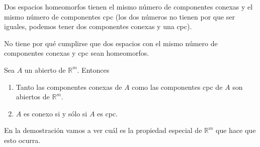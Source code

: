 \documentclass{apuntes}
\begin{document}
\begin{corol} Dos espacios homeomorfos tienen el mismo número de componentes conexas y el mismo número de componentes cpc (los dos números no tienen por que ser iguales, podemos tener dos componentes conexas y una cpc).

No tiene por qué cumplirse que dos espacios con el mismo número de componentes conexas y cpc sean homeomorfos.
\end{corol}

\begin{prop} Sea $A$ un abierto de $ℝ^m$. Entonces

\begin{enumerate}
	\item Tanto las componentes conexas de $A$ como las componentes cpc de $A$ son abiertos de $ℝ^m$.
	\item $A$ es conexo si y sólo si $A$ es cpc.
\end{enumerate}
\end{prop}

En la demostración vamos a ver cuál es la propiedad especial de $ℝ^m$ que hace que esto ocurra.
\end{document}
